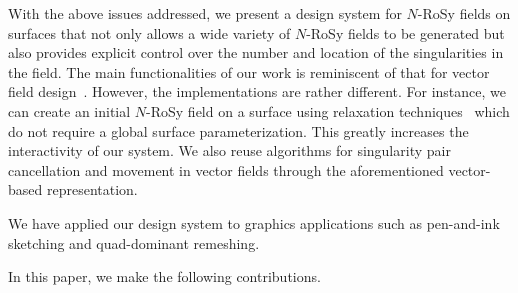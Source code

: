 \documentclass{acmsiggraph}               %
\begin{document}
%
With the above issues addressed, we present a design system for
$N$-RoSy fields on surfaces that not only allows a wide variety of
$N$-RoSy fields to be generated but also provides explicit control
over the number and location of the singularities in the field. The
main functionalities of our work is reminiscent of that for vector
field design~\cite{Zhang:06}. However, the implementations are
rather different. For instance, we can create an initial $N$-RoSy
field on a surface using relaxation techniques~\cite{Turk:01} which
do not require a global surface parameterization. This greatly
increases the interactivity of our system. We also reuse algorithms
for singularity pair cancellation and movement in vector fields
through the aforementioned vector-based representation.

We have applied our design system to graphics applications such as
pen-and-ink sketching and quad-dominant remeshing.


In this paper, we make the following contributions.
\end{document}
